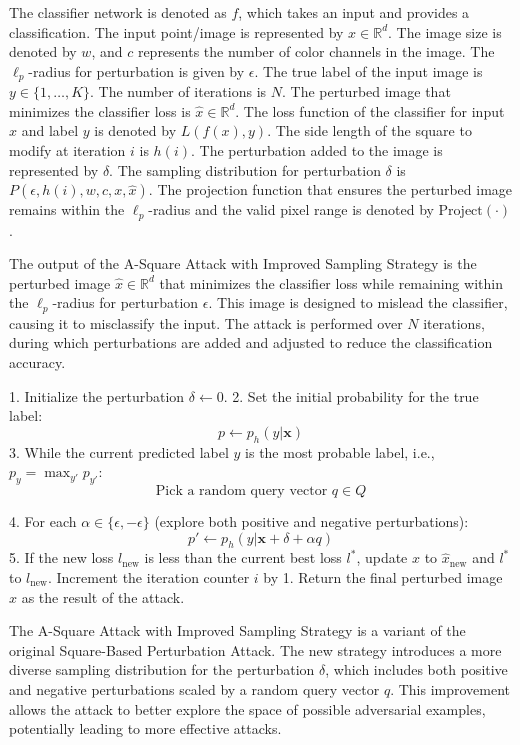 The classifier network is denoted as $f$, which takes an input and provides a classification. The input point/image is represented by $x \in \mathbb{R}^d$. The image size is denoted by $w$, and $c$ represents the number of color channels in the image. The $\ell_p$-radius for perturbation is given by $\epsilon$. The true label of the input image is $y \in \{1, \ldots, K\}$. The number of iterations is $N$. The perturbed image that minimizes the classifier loss is $\hat{x} \in \mathbb{R}^d$. The loss function of the classifier for input $x$ and label $y$ is denoted by $L(f(x), y)$. The side length of the square to modify at iteration $i$ is $h(i)$. The perturbation added to the image is represented by $\delta$. The sampling distribution for perturbation $\delta$ is $P(\epsilon, h(i), w, c, x, \hat{x})$. The projection function that ensures the perturbed image remains within the $\ell_p$-radius and the valid pixel range is denoted by $\text{Project}(\cdot)$.

The output of the A-Square Attack with Improved Sampling Strategy is the perturbed image $\hat{x} \in \mathbb{R}^d$ that minimizes the classifier loss while remaining within the $\ell_p$-radius for perturbation $\epsilon$. This image is designed to mislead the classifier, causing it to misclassify the input. The attack is performed over $N$ iterations, during which perturbations are added and adjusted to reduce the classification accuracy.


1. Initialize the perturbation $\delta \leftarrow 0$.
2. Set the initial probability for the true label:
\[
p \leftarrow p_h(y | \mathbf{x})
\]
3. While the current predicted label $y$ is the most probable label, i.e., $p_y = \max_{y'} p_{y'}$:
\[
\text{Pick a random query vector } q \in Q
\]

4. For each $\alpha \in \{\epsilon, -\epsilon\}$ (explore both positive and negative perturbations):
\[
p' \leftarrow p_h(y | \mathbf{x} + \delta + \alpha q)
\]
5. If the new loss $l_{\text{new}}$ is less than the current best loss $l^*$, update $\hat{x}$ to $\hat{x}_{\text{new}}$ and $l^*$ to $l_{\text{new}}$. Increment the iteration counter $i$ by 1.
Return the final perturbed image $\hat{x}$ as the result of the attack.

The A-Square Attack with Improved Sampling Strategy is a variant of the original Square-Based Perturbation Attack. The new strategy introduces a more diverse sampling distribution for the perturbation $\delta$, which includes both positive and negative perturbations scaled by a random query vector $q$. This improvement allows the attack to better explore the space of possible adversarial examples, potentially leading to more effective attacks.